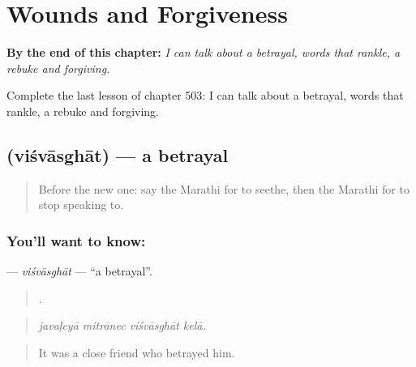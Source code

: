 
\chapter{Wounds and Forgiveness}
\label{ch:mr-wounds-and-forgiveness}

\begin{chapteropening}
\textbf{By the end of this chapter:} \emph{I can talk about a betrayal, words that rankle, a rebuke and forgiving.}

Complete the last lesson of chapter 503: I can talk about a betrayal, words that rankle, a rebuke and forgiving.
\end{chapteropening}

\section[\texorpdfstring{\mr{विश्वासघात} (viśvāsghāt)}{विश्वासघात (viśvāsghāt)}]{ (viśvāsghāt) — a betrayal}

\label{lesson:MR-C503-visvasghat}



\begin{quote}
Before the new one: say the Marathi for to seethe, then the Marathi for to stop speaking to.
\end{quote}

\subsection*{You'll want to know: }
\textbf{} — \emph{viśvāsghāt} — \textquotedblleft{}a betrayal\textquotedblright{}.

\begin{quote}
   .
\end{quote}

\begin{quote}
\emph{javaḷcyā mitrānec viśvāsghāt kelā.}
\end{quote}

\begin{quote}
It was a close friend who betrayed him.
\end{quote}

